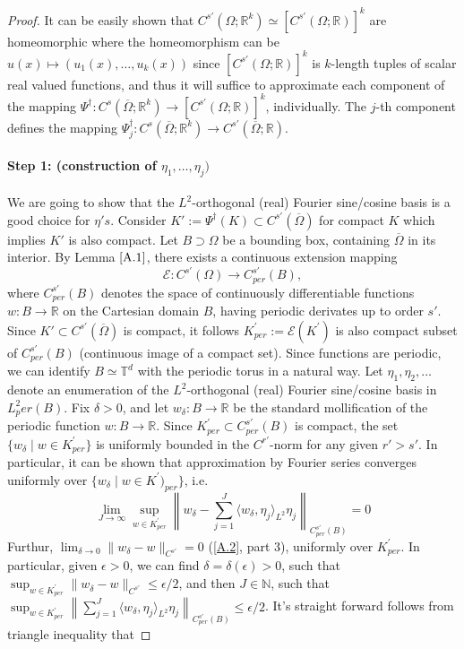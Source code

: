 \documentclass[reqno]{amsart}
\theoremstyle{plain}
\theoremstyle{definition}
\newcommand{\bb}[1]{\mathbb{#1}}
\newcommand{\cal}[1]{\mathcal{#1}}
\begin{document}
\begin{proof}
    It can be easily shown that $C^{s'}(\Omega;\bb R^k) \simeq [C^{s'}(\Omega;\bb R)]^k$ are homeomorphic where the homeomorphism can be $u(x) \mapsto (u_1(x), \dots, u_k(x))$ since $[C^{s'}(\Omega;\bb R)]^k$ is $k$-length tuples of scalar real valued functions, and thus it will suffice to approximate each component of the mapping $\Psi^\dag : C^s(\overline{\Omega};\bb R^k) \to [C^{s'}(\Omega;\bb R)]^k$, individually. The $j$-th component defines the mapping $\Psi^\dag_j : C^s(\overline{\Omega};\bb R^k) \to C^{s'}(\overline{\Omega};\bb R)$. 

    \paragraph{\bf Step 1: (construction of $\eta_1, \dots, \eta_j)$} We are going to show that the $L^2$-orthogonal (real) Fourier sine/cosine basis is a good choice for $\eta's$. Consider $K':= \Psi^\dag(K) \subset C^{s'}(\overline{\Omega})$ for compact $K$ which implies $K'$ is also compact. Let $B \supset \Omega$ be a bounding box, containing $\overline{\Omega}$ in its interior. By Lemma $\ref{A.1}$, there exists a continuous extension mapping
    $$ \cal E : C^{s'}(\Omega) \to C^{s'}_{per}(B),$$
    where $C^{s'}_{per}(B)$ denotes the space of continuously differentiable functions $w : B \to \bb R$ on the Cartesian domain $B$, having periodic derivates up to order $s'$. Since $K' \subset C^{s'}(\overline{\Omega})$ is compact, it follows $K^{'}_{per} := \cal E (K^{'})$ is also compact subset of $C^{s'}_{per}(B)$ (continuous image of a compact set). Since functions are periodic, we can identify $B \simeq \bb T^d$ with the periodic torus in a natural way. Let $\eta_1, \eta_2, \dots$ denote an enumeration of the $L^2$-orthogonal (real) Fourier sine/cosine basis in $L^2_per(B)$. Fix $\delta > 0$, and let $w_\delta : B \to \bb R$ be the standard mollification of the periodic function $w : B \to \bb R$. Since $K^{'}_{per} \subset C^{s'}_{per}(B)$ is compact, the set $\{w_\delta \mid w \in K_{per}^{'} \}$ is uniformly bounded in the $C^{r'}$-norm for any given $r' > s'$. In particular, it can be shown that approximation by Fourier series converges uniformly over $\{w_\delta \mid w \in K^{'})_{per}\}$, i.e. 
    $$ \lim\limits_{J \to \infty} \sup\limits_{w \in K^{'}_{per}}\left\| w_\delta - \sum_{j=1}^J \langle w_\delta,\eta_j\rangle_{L^2}\eta_j\right\|_{C^{s'}_{per}(B)} = 0$$
    Furthur, $\lim_{\delta \to 0} \|w_\delta - w\|_{C^{s'}} = 0$ (\ref{A.2}, part 3), uniformly over $K^{'}_{per}$. In particular, given $\epsilon > 0$, we can find $\delta = \delta(\epsilon) > 0$, such that $\sup_{w \in K^{'}_{per}}\|w_\delta - w\|_{C^{s'}} \leq \epsilon/2$, and then $J \in \bb N$, such that $\sup_{w \in K^{'}_{per}} \left\|\sum_{j=1}^J \langle w_\delta,\eta_j\rangle_{L^2}\eta_j\right\|_{C^{s'}_{per}(B)} \leq \epsilon/2$. It's straight forward follows from triangle inequality that

\end{proof}
\end{document}
